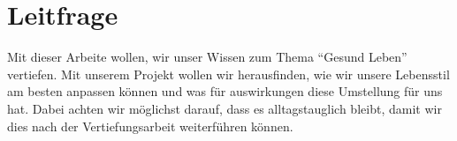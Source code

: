 \chapter{Leitfrage}
\chapterauthor{\dario}

Mit dieser Arbeite wollen, wir unser Wissen zum Thema “Gesund Leben” vertiefen. 
\newline
Mit unserem Projekt wollen wir herausfinden, wie wir unsere Lebensstil am besten anpassen können und was für auswirkungen diese Umstellung für uns hat.
\newline
Dabei achten wir möglichst darauf, dass es alltagstauglich bleibt, damit wir dies nach der Vertiefungsarbeit weiterführen können.